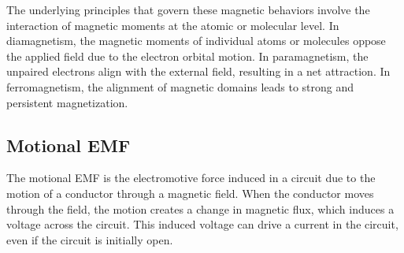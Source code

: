 \documentclass[12pt,b4paper]{article}
\begin{document}
The underlying principles that govern these magnetic behaviors involve the interaction of magnetic moments at the atomic or molecular level. In diamagnetism, the magnetic moments of individual atoms or molecules oppose the applied field due to the electron orbital motion. In paramagnetism, the unpaired electrons align with the external field, resulting in a net attraction. In ferromagnetism, the alignment of magnetic domains leads to strong and persistent magnetization.
\subsection{Motional EMF}
The motional EMF is the electromotive force induced in a circuit due to the motion of a conductor through a magnetic field. When the conductor moves through the field, the motion creates a change in magnetic flux, which induces a voltage across the circuit. This induced voltage can drive a current in the circuit, even if the circuit is initially open.
\end{document}
